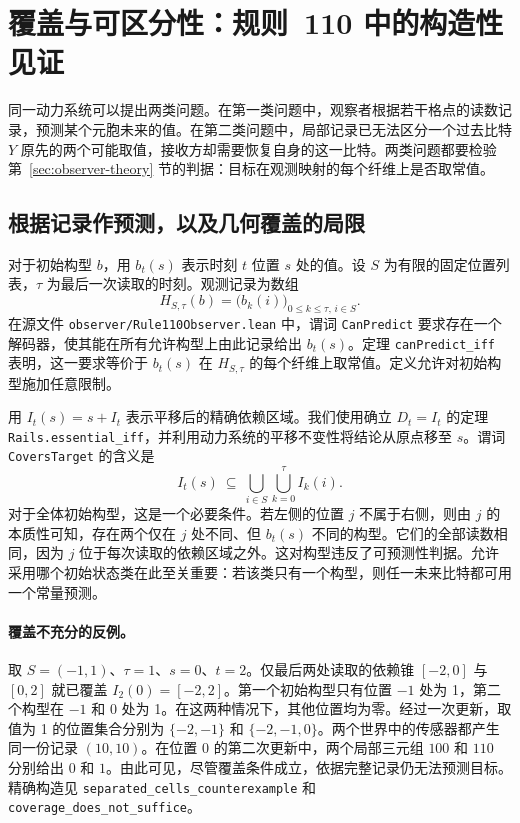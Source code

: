 \section{覆盖与可区分性：规则~110 中的构造性见证}
\label{sec:observer-witnesses}

同一动力系统可以提出两类问题。在第一类问题中，观察者根据若干格点的读数记录，预测某个元胞未来的值。在第二类问题中，局部记录已无法区分一个过去比特 $Y$ 原先的两个可能取值，接收方却需要恢复自身的这一比特。两类问题都要检验第~\ref{sec:observer-theory} 节的判据：目标在观测映射的每个纤维上是否取常值。

\subsection{根据记录作预测，以及几何覆盖的局限}
\label{sec:observer-coverage}

对于初始构型 $b$，用 $b_t(s)$ 表示时刻 $t$ 位置 $s$ 处的值。设 $S$ 为有限的固定位置列表，$\tau$ 为最后一次读取的时刻。观测记录为数组
\[
 H_{S,\tau}(b)=\bigl(b_k(i)\bigr)_{0\le k\le\tau,\,i\in S}.
\]
在源文件 \nolinkurl{observer/Rule110Observer.lean} 中，谓词 \texttt{CanPredict} 要求存在一个解码器，使其能在所有允许构型上由此记录给出 $b_t(s)$。定理 \texttt{canPredict\_iff} 表明，这一要求等价于 $b_t(s)$ 在 $H_{S,\tau}$ 的每个纤维上取常值。定义允许对初始构型施加任意限制。

用 $I_t(s)=s+I_t$ 表示平移后的精确依赖区域。我们使用确立 $D_t=I_t$ 的定理 \texttt{Rails.essential\_iff}，并利用动力系统的平移不变性将结论从原点移至 $s$。谓词 \texttt{CoversTarget} 的含义是
\begin{equation}
 I_t(s)\ \subseteq\ \bigcup_{i\in S}\bigcup_{k=0}^{\tau} I_k(i).
 \label{eq:observer-cover}
\end{equation}
对于全体初始构型，这是一个必要条件。若左侧的位置 $j$ 不属于右侧，则由 $j$ 的本质性可知，存在两个仅在 $j$ 处不同、但 $b_t(s)$ 不同的构型。它们的全部读数相同，因为 $j$ 位于每次读取的依赖区域之外。这对构型违反了可预测性判据。允许采用哪个初始状态类在此至关重要：若该类只有一个构型，则任一未来比特都可用一个常量预测。

\paragraph{覆盖不充分的反例。}
取 $S=(-1,1)$、$\tau=1$、$s=0$、$t=2$。仅最后两处读取的依赖锥 $[-2,0]$ 与 $[0,2]$ 就已覆盖 $I_2(0)=[-2,2]$。第一个初始构型只有位置 $-1$ 处为 1，第二个构型在 $-1$ 和 $0$ 处为 1。在这两种情况下，其他位置均为零。经过一次更新，取值为 1 的位置集合分别为 $\{-2,-1\}$ 和 $\{-2,-1,0\}$。两个世界中的传感器都产生同一份记录 $(10,10)$。在位置 $0$ 的第二次更新中，两个局部三元组 $100$ 和 $110$ 分别给出 $0$ 和 $1$。由此可见，尽管覆盖条件成立，依据完整记录仍无法预测目标。精确构造见 \texttt{separated\_cells\_counterexample} 和 \texttt{coverage\_does\_not\_suffice}。


